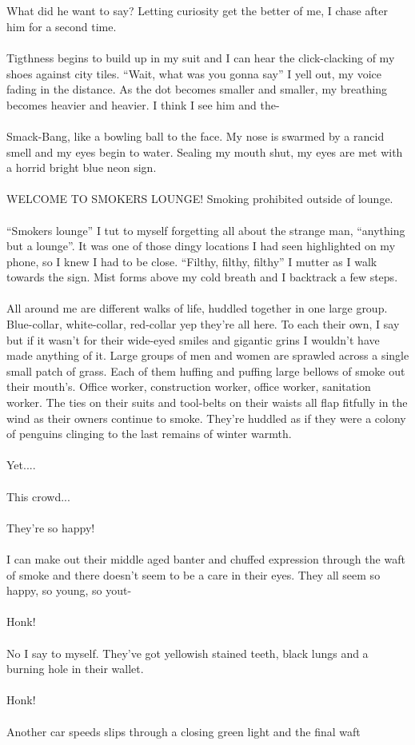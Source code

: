 \documentclass{book}
\begin{document}
{{\\\\What did he want to say?
Letting curiosity get the better of me, I chase after him for a second time.\\\\Tigthness begins to build up in my suit and I can hear the click-clacking of my shoes against city tiles. ``Wait, what was you gonna say'' I yell out, my voice fading in the distance. As the dot becomes smaller and smaller, my breathing becomes heavier and heavier. I think I see him and the-\\\\Smack-Bang, like a bowling ball to the face. My nose is swarmed by a rancid smell and my eyes begin to water. Sealing my mouth shut, my eyes are met with a horrid bright blue neon sign.\\\\WELCOME TO SMOKERS LOUNGE! Smoking prohibited outside of lounge.\\\\``Smokers lounge'' I tut to myself forgetting all about the strange man, ``anything but a lounge''. It was one of those dingy locations I had seen highlighted on my phone, so I knew I had to be close. ``Filthy, filthy, filthy'' I mutter as I walk towards the sign. Mist forms above my cold breath and I backtrack a few steps.\\\\All around me are different walks of life, huddled together in one large group. Blue-collar, white-collar, red-collar yep they're all here. To each their own, I say but if it wasn't for their wide-eyed smiles and gigantic grins I wouldn't have made anything of it. Large groups of men and women are sprawled across a single small patch of grass. Each of them huffing and puffing large bellows of smoke out their mouth's. Office worker, construction worker, office worker, sanitation worker. The ties on their suits and tool-belts on their waists all flap fitfully in the wind as their owners continue to smoke. They're huddled as if they were a colony of penguins clinging to the last remains of winter warmth.\\\\Yet....\\\\This crowd...\\\\ They're so happy!\\\\I can make out their middle aged banter and chuffed expression through the waft of smoke and there doesn't seem to be a care in their eyes. They all seem so happy, so young, so yout-\\\\Honk!\\\\No I say to myself. They've got yellowish stained teeth, black lungs and a burning hole in their wallet.\\\\Honk!\\\\ Another car speeds slips through a closing green light and the final waft }}
\end{document}
